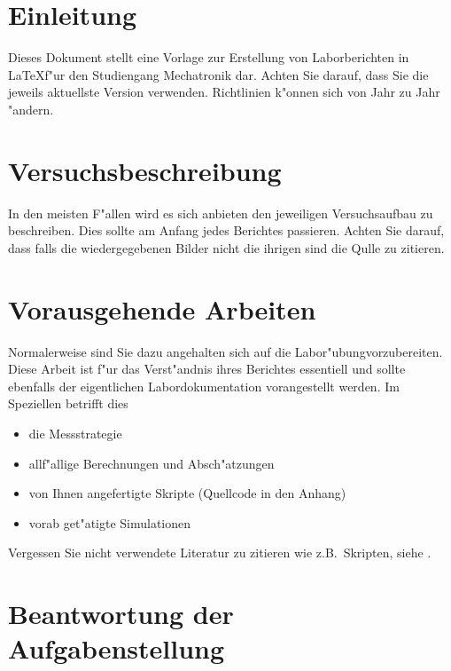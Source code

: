 \documentclass[a4paper,oneside,10pt]{article}%
\begin{document}

\pagestyle{plain}



\tableofcontents%
\listoffigures
\listoftables

\newpage

\pagestyle{fancy}

\section{Einleitung}

Dieses Dokument stellt eine Vorlage zur Erstellung von Laborberichten in \LaTeX f"ur den Studiengang Mechatronik dar. Achten Sie darauf, dass Sie die jeweils aktuellste Version verwenden. Richtlinien k"onnen sich von Jahr zu Jahr "andern.

\section{Versuchsbeschreibung}

In den meisten F"allen wird es sich anbieten den jeweiligen Versuchsaufbau zu beschreiben. Dies sollte am Anfang jedes Berichtes passieren. Achten Sie darauf, dass falls die wiedergegebenen Bilder nicht die ihrigen sind die Qulle zu zitieren.

\section{Vorausgehende Arbeiten}

Normalerweise sind Sie dazu angehalten sich auf die Labor"ubungvorzubereiten. Diese Arbeit ist f"ur das Verst"andnis ihres Berichtes essentiell und sollte ebenfalls der eigentlichen Labordokumentation vorangestellt werden. Im Speziellen betrifft dies
\begin{itemize}
\item die Messstrategie
\item allf"allige Berechnungen und Absch"atzungen
\item von Ihnen angefertigte Skripte (Quellcode in den Anhang)
\item vorab get"atigte Simulationen
\end{itemize}
Vergessen Sie nicht verwendete Literatur zu zitieren wie z.B.~Skripten, siehe \cite{meh10}.

\section{Beantwortung der Aufgabenstellung}
\end{document}
